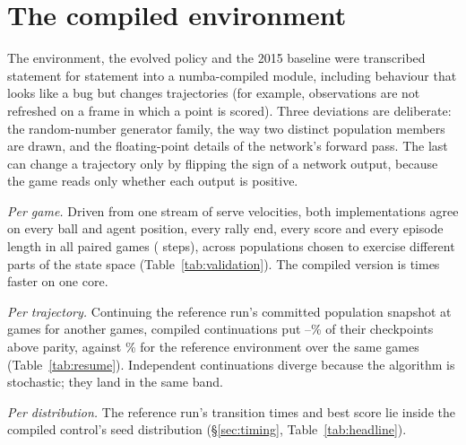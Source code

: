 \documentclass[11pt]{article}
\begin{document}
\begin{table}[!htbp]
\centering\small
\caption{Phase-change timing per condition.}
\label{tab:timing}
\resizebox{\linewidth}{!}{}
\end{table}


\FloatBarrier
\section{The compiled environment}
\label{app:compiled}

The environment, the evolved policy and the 2015 baseline were transcribed
statement for statement into a numba-compiled module, including behaviour
that looks like a bug but changes trajectories (for example, observations are
not refreshed on a frame in which a point is scored). Three deviations are
deliberate: the random-number generator family, the way two distinct
population members are drawn, and the floating-point details of the network's
forward pass. The last can change a trajectory only by flipping the sign of a
network output, because the game reads only whether each output is positive.

\emph{Per game.} Driven from one stream of serve velocities, both
implementations agree on every ball and agent position, every rally end, every
score and every episode length in all \nValGames{} paired games
(\nValSteps{} steps), across \nValScenarios{} populations chosen to exercise different parts
of the state space (Table~\ref{tab:validation}). The compiled version is
\nValSpeedup{} times faster on one core.

\emph{Per trajectory.} Continuing the reference run's committed population
snapshot at \nResumeSnapshot{} games for another \nResumeGames{} games,
\nResumeN{} compiled continuations put \nResumeAboveMin--\nResumeAboveMax\% of
their checkpoints above parity, against \nRefContAbove\% for the reference
environment over the same games (Table~\ref{tab:resume}). Independent
continuations diverge because the algorithm is stochastic; they land in the
same band.

\emph{Per distribution.} The reference run's transition times and best score
lie inside the compiled control's seed distribution (\S\ref{sec:timing},
Table~\ref{tab:headline}).

\begin{table}[!htbp]
\centering\small
\caption{Bit-level validation of the compiled environment.}
\label{tab:validation}
\resizebox{\linewidth}{!}{}
\end{table}
\end{document}
